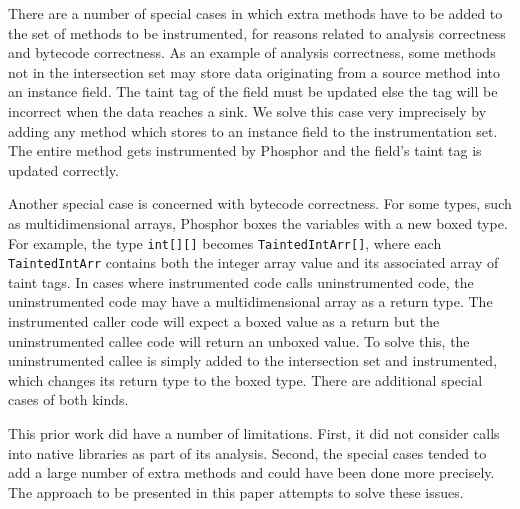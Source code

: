 There are a number of special cases in which extra methods have to be
added to the set of methods to be instrumented, for reasons related to
analysis correctness and bytecode correctness. As an example of
analysis correctness, some methods not in the intersection set may
store data originating from a source method into an instance
field. The taint tag of the field must be updated else the tag will be
incorrect when the data reaches a sink. We solve this case very
imprecisely by adding any method which stores to an instance field to
the instrumentation set. The entire method gets instrumented by
Phosphor and the field's taint tag is updated correctly.

Another special case is concerned with bytecode correctness. For some
types, such as multidimensional arrays, Phosphor boxes the variables
with a new boxed type. For example, the type \texttt{int[][]} becomes
\texttt{TaintedIntArr[]}, where each \texttt{TaintedIntArr} contains
both the integer array value and its associated array of taint
tags. In cases where instrumented code calls uninstrumented code, the
uninstrumented code may have a multidimensional array as a return
type. The instrumented caller code will expect a boxed value as a
return but the uninstrumented callee code will return an unboxed
value. To solve this, the uninstrumented callee is simply added to the
intersection set and instrumented, which changes its return type to
the boxed type. There are additional special cases of both kinds.

This prior work did have a number of limitations. First, it did not
consider calls into native libraries as part of its analysis. Second,
the special cases tended to add a large number of extra methods and
could have been done more precisely. The approach to be presented in
this paper attempts to solve these issues.

